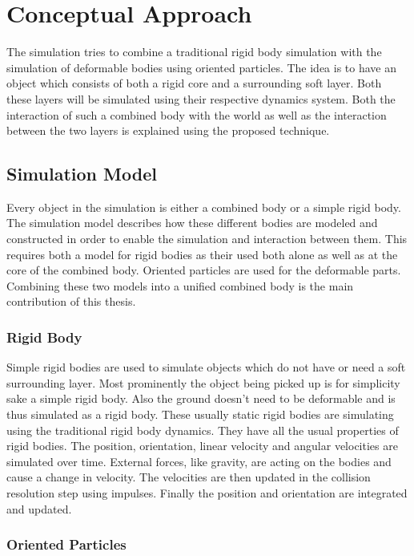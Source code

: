 \chapter{Conceptual Approach}
\label{cha:conceptual_approach}

The simulation tries to combine a traditional rigid body simulation with the simulation of deformable bodies using oriented particles. The idea is to have an object which consists of both a rigid core and a surrounding soft layer. Both these layers will be simulated using their respective dynamics system. Both the interaction of such a combined body with the world as well as the interaction between the two layers is explained using the proposed technique.

\section{Simulation Model}
\label{sec:simulation_model}

Every object in the simulation is either a combined body or a simple rigid body. The simulation model describes how these different bodies are modeled and constructed in order to enable the simulation and interaction between them. This requires both a model for rigid bodies as their used both alone as well as at the core of the combined body. Oriented particles are used for the deformable parts. Combining these two models into a unified combined body is the main contribution of this thesis.
\subsection{Rigid Body}

Simple rigid bodies are used to simulate objects which do not have or need a soft surrounding layer. Most prominently the object being picked up is for simplicity sake a simple rigid body. Also the ground doesn't need to be deformable and is thus simulated as a rigid body. These usually static rigid bodies are simulating using the traditional rigid body dynamics. They have all the usual properties of rigid bodies. The position, orientation, linear velocity and angular velocities are simulated over time. External forces, like gravity, are acting on the bodies and cause a change in velocity. The velocities are then updated in the collision resolution step using impulses. Finally the position and orientation are integrated and updated.

\subsection{Oriented Particles}

